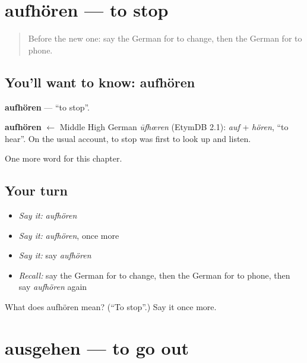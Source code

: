 \section[aufhören]{aufhören — to stop}

\label{lesson:GE-C144-aufhoeren}



\begin{quote}
Before the new one: say the German for to change, then the German for to phone.
\end{quote}

\subsection*{You'll want to know: aufhören}
\textbf{aufhören} — \textquotedblleft{}to stop\textquotedblright{}.

\begin{cousinweb}
\textbf{aufhören} $\leftarrow$ Middle High German \emph{ūfhœren} (EtymDB 2.1): \emph{auf} + \emph{hören}, \textquotedblleft{}to hear\textquotedblright{}. On the usual account, to stop was first to look up and listen.
\end{cousinweb}

\begin{grammarlens}[title={What you've built}]
One more word for this chapter.
\end{grammarlens}

\subsection*{Your turn}
\begin{itemize}
\raggedright
  \item \emph{Say it:} \emph{aufhören}
  \item \emph{Say it:} \emph{aufhören}, once more
  \item \emph{Say it:} say \emph{aufhören}
  \item \emph{Recall:} say the German for to change, then the German for to phone, then say \emph{aufhören} again
\end{itemize}

\begin{tcolorbox}[breakable,colback=teal!4,colframe=teal!35!black,title={Before you move on}]
What does aufhören mean? (\textquotedblleft{}To stop\textquotedblright{}.) Say it once more.
\end{tcolorbox}
\section[ausgehen]{ausgehen — to go out}

